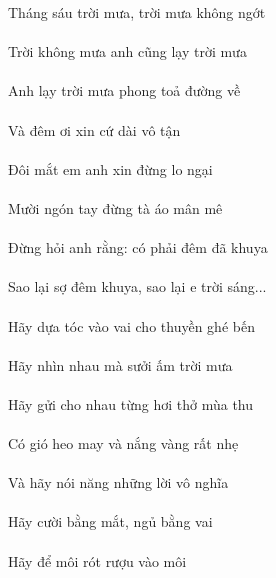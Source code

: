\documentclass[14pt,a4paper]{extarticle}
\begin{document}
Tháng sáu trời mưa, trời mưa không ngớt\\[1ex]
{\Huge{}}\\[1ex]
Trời không mưa anh cũng lạy trời mưa\\[1ex]
{\Huge{}\ANH{}}\\[1ex]
Anh lạy trời mưa phong toả đường về\\[1ex]
{\Huge\ANH{}\Phong{}}\\[1ex]
Và đêm ơi xin cứ dài vô tận\\[1ex]
{\Huge{}\xin{}}\\[1ex]
Đôi mắt em anh xin đừng lo ngại\\[1ex]
{\Huge{}\em\ANH\xin{}\lo{}}\\[1ex]
Mười ngón tay đừng tà áo mân mê\\[1ex]
{\Huge{}\tay{}}\\[1ex]
Đừng hỏi anh rằng: có phải đêm đã khuya\\[1ex]
{\Huge{}\ANH{} \khuya}\\[1ex]
Sao lại sợ đêm khuya, sao lại e trời sáng...\\[1ex]
{\Huge\sao{}\khuya\sao{}\e {} }\\[1ex]
Hãy dựa tóc vào vai cho thuyền ghé bến\\[1ex]
{\Huge{}\vai\cho{} }\\[1ex]
Hãy nhìn nhau mà sưởi ấm trời mưa\\[1ex]
{\Huge{}\nhau{}}\\[1ex]\newpage 
Hãy gửi cho nhau từng hơi thở mùa thu\\[1ex]
{\Huge{}\cho\nhau{} \thu}\\[1ex]
Có gió heo may và nắng vàng rất nhẹ\\[1ex]
{\Huge{}\heomay{} }\\[1ex]
Và hãy nói năng những lời vô nghĩa\\[1ex]
{\Huge{}}\\[1ex]
Hãy cười bằng mắt, ngủ bằng vai\\[1ex]
{\Huge{}\vai}\\[1ex]
Hãy để môi rót rượu vào môi\\[1ex]
{\Huge{}}\\[1ex]
\end{document}
